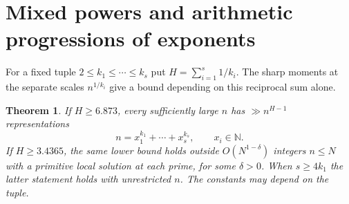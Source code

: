 \documentclass[11pt,letterpaper]{article}
\newtheorem{theorem}{Theorem}[section]
\theoremstyle{definition}
\begin{document}
\section{Mixed powers and arithmetic progressions of exponents}\label{sec:mixed}
For a fixed tuple $2\le k_1\le\cdots\le k_s$ put
$H=\sum_{i=1}^s 1/k_i$. The sharp moments at the separate scales
$n^{1/k_i}$ give a bound depending on this reciprocal sum alone.
\begin{theorem}\label{thm:mixed}
If $H\ge6.873$, every sufficiently large $n$ has
$\gg n^{H-1}$ representations
\[
 n=x_1^{k_1}+\cdots+x_s^{k_s},\qquad x_i\in\mathbb N .
\]
If $H\ge3.4365$, the same lower bound holds outside
$O(N^{1-\delta})$ integers $n\le N$ with a primitive local solution
at each prime, for some $\delta>0$. When $s\ge4k_1$ the latter
statement holds with unrestricted $n$. The constants may depend on the tuple.
\end{theorem}
\end{document}
